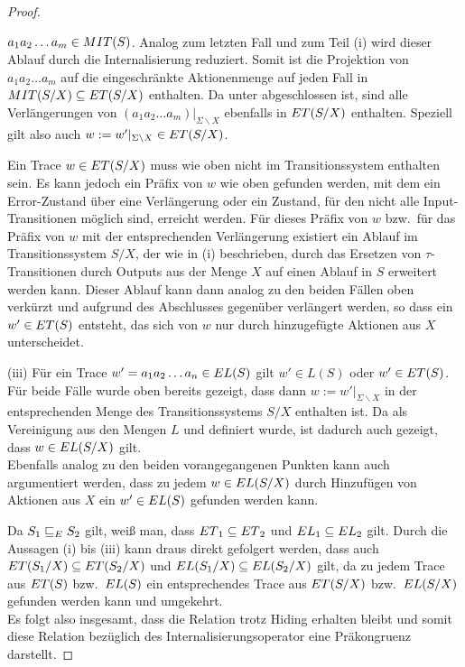 \begin{proof}
\begin{itemize}
      $a_1a_2\dots a_m\in MIT{}(S)$. Analog zum letzten Fall und zum Teil (i)
      wird dieser Ablauf durch die Internalisierung reduziert. Somit ist die
      Projektion von $a_1a_2\dots a_m$ auf die eingeschränkte Aktionenmenge auf
      jeden Fall in $MIT{}(S/X)\subseteq ET{}(S/X)$ enthalten. Da \ET{} unter
      \cont{} abgeschlossen ist, sind alle Verlängerungen von $(a_1a_2\dots
      a_m)|_{\Sigma \backslash X}$ ebenfalls in $ET{}(S/X)$ enthalten.
      Speziell gilt also auch $w:=w'|_{\Sigma\backslash X}\in ET{}(S/X)$.
  \end{itemize}
  Ein Trace $w\in ET{}(S/X)$ muss wie oben nicht im Transitionssystem
  enthalten sein. Es kann jedoch ein Präfix von $w$ wie oben gefunden werden,
  mit dem ein Error-Zustand über eine Verlängerung oder ein Zustand, für den
  nicht alle Input-Transitionen möglich sind, erreicht werden. Für dieses
  Präfix von $w$ bzw.\ für das Präfix von $w$ mit der entsprechenden
  Verlängerung existiert ein Ablauf im Transitionssystem $S/X$, der wie in (i)
  beschrieben, durch das Ersetzen von $\tau$-Transitionen durch Outputs aus der
  Menge $X$ auf einen Ablauf in
  $S$ erweitert werden kann. Dieser Ablauf kann dann analog zu den beiden
  Fällen oben verkürzt und aufgrund des Abschlusses gegenüber \cont{}
  verlängert werden, so dass ein $w'\in ET{}(S)$ entsteht, das sich von $w$
  nur durch hinzugefügte Aktionen aus $X$ unterscheidet.

  (iii)
  Für ein Trace $w'=a_1a_2\dots a_n\in EL{}(S)$ gilt $w'\in L(S)$ oder $w'\in
  ET{}(S)$. Für beide Fälle wurde oben bereits gezeigt, dass dann
  $w:=w'|_{\Sigma\backslash X}$ in der entsprechenden Menge des
  Transitionssystems $S/X$ enthalten ist. Da \EL{} als Vereinigung aus den
  Mengen $L$ und \ET{} definiert wurde, ist dadurch auch gezeigt, dass
  $w\in EL{}(S/X)$ gilt.\\
  Ebenfalls analog zu den beiden vorangegangenen Punkten kann auch argumentiert
  werden, dass zu jedem $w\in EL{}(S/X)$ durch Hinzufügen von Aktionen aus $X$
  ein $w'\in EL{}(S)$ gefunden werden kann.

  Da $S_1\sqsubseteq _E S_2$ gilt, weiß man, dass $ET{}_1\subseteq ET{}_2$ und
  $EL{}_1\subseteq EL{}_2$ gilt. Durch die Aussagen (i) bis (iii) kann draus
  direkt gefolgert werden, dass auch $ET{}(S_1/X)\subseteq ET{}(S_2/X)$ und
  $EL{}(S_1/X)\subseteq EL{}(S_2/X)$ gilt, da zu jedem Trace aus $ET(S)$
  bzw.\ $EL{}(S)$ ein entsprechendes Trace aus $ET(S/X)$ bzw.\ $EL{}(S/X)$
  gefunden werden kann und umgekehrt.\\
  Es folgt also insgesamt, dass die Relation \ERel{} trotz Hiding erhalten
  bleibt und somit diese Relation bezüglich des Internalisierungsoperator eine
  Präkongruenz darstellt.
\end{proof}

